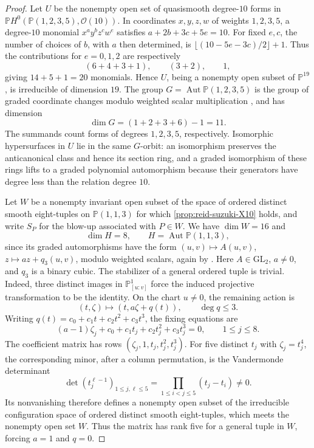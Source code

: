 \documentclass[11pt]{article}
\theoremstyle{plain}
\theoremstyle{definition}
\theoremstyle{remark}
\newcommand{\Pp}{\mathbb P}
\newcommand{\GL}{\mathrm{GL}}
\newcommand{\OO}{\mathcal O}
\begin{document}
\begin{proof}
Let \(U\) be the nonempty open set of quasismooth
degree-\(10\) forms in
\(\Pp H^0(\Pp(1,2,3,5),\OO(10))\). In coordinates \(x,y,z,w\)
of weights \(1,2,3,5\), a degree-\(10\) monomial
\(x^a y^b z^c w^e\) satisfies \(a+2b+3c+5e=10\).
For fixed \(e,c\), the number of choices of \(b\), with \(a\)
then determined, is \(\lfloor(10-5e-3c)/2\rfloor+1\). Thus the
contributions for \(e=0,1,2\) are respectively
\[
(6+4+3+1),\qquad (3+2),\qquad 1,
\]
giving \(14+5+1=20\) monomials. Hence \(U\), being a nonempty
open subset of \(\Pp^{19}\), is irreducible of dimension \(19\). The group
\(G=\operatorname{Aut}\Pp(1,2,3,5)\) is the group of graded coordinate
changes modulo weighted scalar multiplication
\cite[Theorem~4.2]{Cox1995}, and has dimension
\[
\dim G=(1+2+3+6)-1=11.
\]
The summands count forms of degrees \(1,2,3,5\), respectively. Isomorphic
hypersurfaces in \(U\) lie in the same \(G\)-orbit: an isomorphism preserves
the anticanonical class and hence its section ring, and a graded
isomorphism of these rings lifts to a graded polynomial automorphism
because their generators have degree less than the relation degree \(10\).

Let \(W\) be a nonempty invariant open subset of the space of ordered distinct smooth
eight-tuples on \(\Pp(1,1,3)\) for which \cref{prop:reid-suzuki-X10} holds, and write
\(S_P\) for the blow-up associated with \(P\in W\). We have
\(\dim W=16\) and
\[
\dim H=8,
\qquad H=\operatorname{Aut}\Pp(1,1,3),
\]
since its graded automorphisms have the form
\((u,v)\mapsto A(u,v)\), \(z\mapsto az+q_3(u,v)\), modulo weighted
scalars, again by \cite[Theorem~4.2]{Cox1995}.
Here \(A\in\GL_2\), \(a\ne0\), and \(q_3\) is a binary cubic.
The stabilizer of a general ordered tuple is trivial. Indeed, three
distinct images in \(\Pp^1_{[u:v]}\) force the induced projective
transformation to be the identity. On the chart \(u\ne0\), the remaining
action is
\[
(t,\zeta)\longmapsto(t,a\zeta+q(t)),
\qquad \deg q\leq3.
\]
Writing \(q(t)=c_0+c_1t+c_2t^2+c_3t^3\), the fixing equations are
\[
(a-1)\zeta_j+c_0+c_1t_j+c_2t_j^2+c_3t_j^3=0,
\qquad 1\leq j\leq8.
\]
The coefficient matrix has rows \((\zeta_j,1,t_j,t_j^2,t_j^3)\).
For five distinct \(t_j\) with \(\zeta_j=t_j^4\), the corresponding
minor, after a column permutation, is the Vandermonde determinant
\[
\det(t_j^{\ell-1})_{1\leq j,\ell\leq5}
=\prod_{1\leq i<j\leq5}(t_j-t_i)\ne0.
\]
Its nonvanishing therefore defines a nonempty open subset of the
irreducible configuration space of ordered distinct smooth eight-tuples,
which meets the nonempty open set \(W\). Thus the matrix has rank five
for a general tuple in \(W\), forcing \(a=1\) and \(q=0\).


\end{proof}
\end{document}
